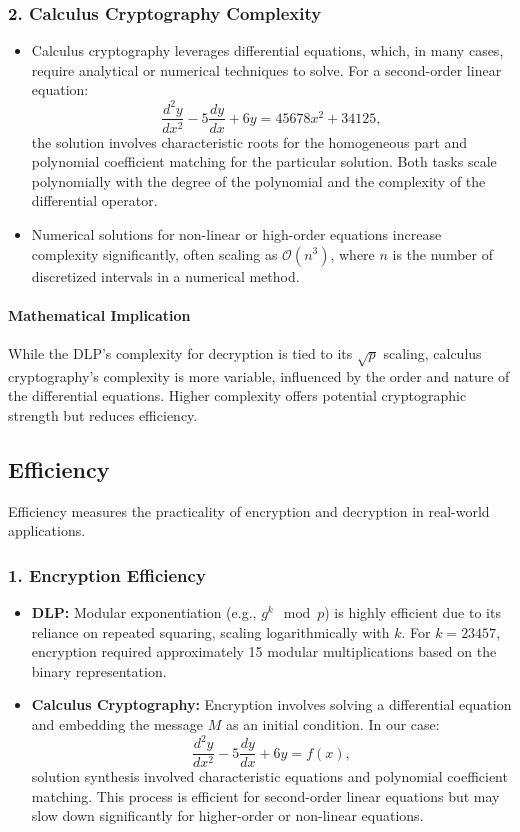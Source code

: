 \documentclass[12pt]{article}
\begin{document}
\subsubsection*{2. Calculus Cryptography Complexity}
\begin{itemize}
    \item Calculus cryptography leverages differential equations, which, in many cases, require analytical or numerical techniques to solve. For a second-order linear equation:
    \[
    \frac{d^2y}{dx^2} - 5\frac{dy}{dx} + 6y = 45678x^2 + 34125,
    \]
    the solution involves characteristic roots for the homogeneous part and polynomial coefficient matching for the particular solution. Both tasks scale polynomially with the degree of the polynomial and the complexity of the differential operator.
    \item Numerical solutions for non-linear or high-order equations increase complexity significantly, often scaling as \( \mathcal{O}(n^3) \), where \( n \) is the number of discretized intervals in a numerical method.
\end{itemize}

\paragraph*{Mathematical Implication}
While the DLP’s complexity for decryption is tied to its \( \sqrt{p} \) scaling, calculus cryptography’s complexity is more variable, influenced by the order and nature of the differential equations. Higher complexity offers potential cryptographic strength but reduces efficiency.

\subsection*{Efficiency}

Efficiency measures the practicality of encryption and decryption in real-world applications.

\subsubsection*{1. Encryption Efficiency}
\begin{itemize}
    \item \textbf{DLP:} Modular exponentiation (e.g., \( g^k \mod p \)) is highly efficient due to its reliance on repeated squaring, scaling logarithmically with \( k \). For \( k = 23457 \), encryption required approximately 15 modular multiplications based on the binary representation.
    \item \textbf{Calculus Cryptography:} Encryption involves solving a differential equation and embedding the message \( M \) as an initial condition. In our case:
    \[
    \frac{d^2y}{dx^2} - 5\frac{dy}{dx} + 6y = f(x),
    \]
    solution synthesis involved characteristic equations and polynomial coefficient matching. This process is efficient for second-order linear equations but may slow down significantly for higher-order or non-linear equations.
\end{itemize}
\end{document}
